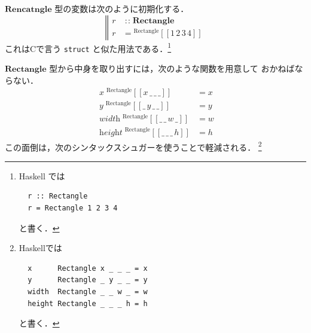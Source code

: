 \documentclass[a5paper,twoside,fleqn]{jsbook}
\def\[{\left[\!\left[}
\def\]{\right]\!\right]}
\newcommand{\programminglanguage}[1]{\textsf{#1}}
\newcommand{\clang}{\programminglanguage{C}}
\newcommand{\haskell}{\programminglanguage{Haskell}}
\newcommand{\code}[1]{\texttt{#1}}
\newcommand{\mBrace}{\Vert}
\newcommand{\mAnyParam}{\_}
\newcommand{\mFunc}[1]{\mathop{\mathit{#1}}}
\DeclareMathOperator{\mIn}{{:\!:}}
\newcommand{\mType}[1]{\mathbf{#1}}
\newcommand{\mGenericValueConstructor}[1]{\mathrm{#1}}
\newcommand{\mGenericWith}[2]{{}^\mGenericValueConstructor{#1}\[#2\]}
\begin{document}
$\mType{Rencatngle}$ 型の変数は次のように初期化する．
\begin{equation}
\left\mBrace
\begin{aligned}
r&\mIn\mType{Rectangle}\\
r&=\mGenericWith{Rectangle}{1\,2\,3\,4}
\end{aligned}
\right.
\end{equation}
これは\clang で言う \code{struct} と似た用法である．\footnote{\haskell
では
\begin{verbatim}
  r :: Rectangle
  r = Rectangle 1 2 3 4
\end{verbatim}
と書く．}

$\mType{Rectangle}$ 型から中身を取り出すには，次のような関数を用意して
おかねばならない．
\begin{align}
\mFunc{x}\mGenericWith{Rectangle}{x\,\mAnyParam\,\mAnyParam\,\mAnyParam}&=x\\
\mFunc{y}\mGenericWith{Rectangle}{\mAnyParam\,y\,\mAnyParam\,\mAnyParam}&=y\\
\mFunc{width}\mGenericWith{Rectangle}{\mAnyParam\,\mAnyParam\,w\,\mAnyParam}&=w\\
\mFunc{height}\mGenericWith{Rectangle}{\mAnyParam\,\mAnyParam\,\mAnyParam\,h}&=h
\end{align}
この面倒は，次のシンタックスシュガーを使うことで軽減される．
\footnote{\haskell では
\begin{verbatim}
  x      Rectangle x _ _ _ = x
  y      Rectangle _ y _ _ = y
  width  Rectangle _ _ w _ = w
  height Rectangle _ _ _ h = h
\end{verbatim}
と書く．}
\end{document}
